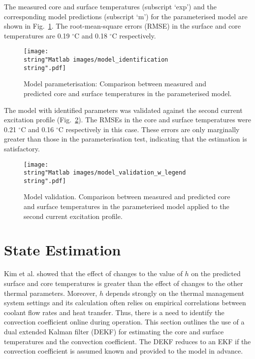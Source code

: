 \documentclass[journal, english]{IEEEtran}
\begin{document}
The measured core and surface temperatures (subscript `exp') and the corresponding model predictions (subscript `m') for the parameterised model are shown in Fig.\ \ref{fig:Parameterisation}.
The root-mean-square errors (RMSE) in the surface and core temperatures are 0.19 $^{\circ}$C
and 0.18 $^{\circ}$C respectively. 
\begin{figure}[h]
\begin{centering}
\texttt{[image: \\string"Matlab images/model\_identification\\string".pdf]}
\par\end{centering}
\caption{Model parameterisation: Comparison between measured and predicted
core and surface temperatures in the parameterised model.\label{fig:Parameterisation}}
\end{figure}

The model with identified parameters was validated against the second
current excitation profile (Fig.\ \ref{fig:Validation}). The RMSEs in the core and surface temperatures were 0.21 $^{\circ}$C
and 0.16 $^{\circ}$C respectively in this case. These errors are only
marginally greater than those in the parameterisation test, indicating
that the estimation is satisfactory.
\begin{figure}[h]
\begin{centering}
\texttt{[image: \\string"Matlab images/model\_validation\_w\_legend\\string".pdf]}
\par\end{centering}
\caption{Model validation. Comparison between measured and predicted core and
surface temperatures in the parameterised model applied to the second
current excitation profile.\label{fig:Validation}}
\end{figure}

\section{State Estimation}
Kim et al. \cite{Kim2013} showed that the effect of changes to the
value of $h$ on the predicted surface and core temperatures is greater
than the effect of changes to the other thermal parameters. Moreover, $h$ depends strongly on the thermal
management system settings and its calculation often relies on empirical
correlations between coolant flow rates and heat transfer. Thus, there
is a need to identify the convection coefficient online during operation.
This section outlines the use of a dual extended Kalman filter (DEKF) \cite{Wan2001}
for estimating the core and surface temperatures and the convection
coefficient. The DEKF reduces to an EKF if the convection coefficient
is assumed known and provided to the model in advance.
\end{document}
